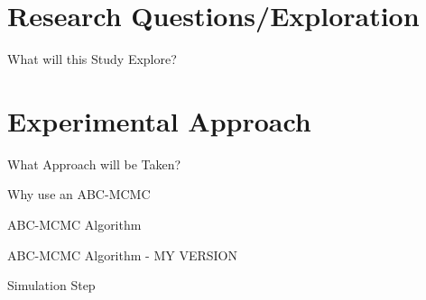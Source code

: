 \documentclass{beamer}
\begin{document}
	\section{Research Questions/Exploration}
	\begin{frame}{What will this Study Explore?}
		
		
	\end{frame}

	\section{Experimental Approach}
	\begin{frame}{What Approach will be Taken?}
	
	
	\end{frame}

	\begin{frame}{Why use an ABC-MCMC}
	
	
	\end{frame}

	\begin{frame}{ABC-MCMC Algorithm}
	
	
	\end{frame}

	\begin{frame}{ABC-MCMC Algorithm - MY VERSION}
	
	
	\end{frame}

	\begin{frame}{Simulation Step}
	
	
	\end{frame}

\end{document}
